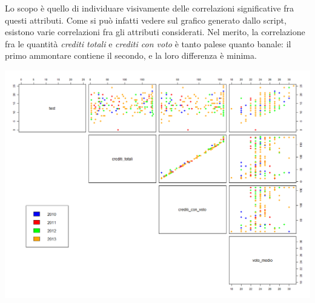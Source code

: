 Lo scopo è quello di individuare visivamente delle correlazioni significative fra questi attributi. Come si può infatti vedere sul grafico generato dallo script, esistono varie correlazioni fra gli attributi considerati. Nel merito, la correlazione fra le quantità \textit{crediti totali} e \textit{crediti con voto} è tanto palese quanto banale: il primo ammontare contiene il secondo, e la loro differenza è minima. 

\begin{center}
	\includegraphics[scale=0.32]{img/scatter_plot_1_gen.png}
\end{center}